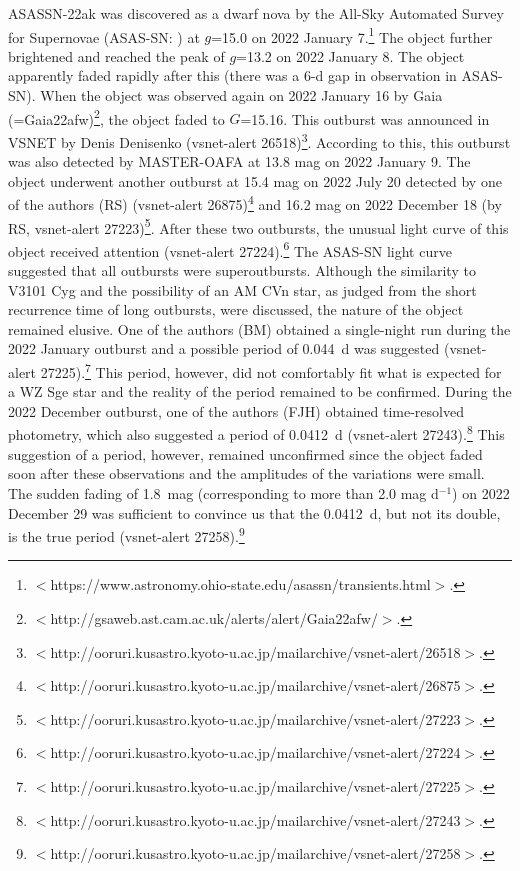 \documentclass{article}
\def\cite{\citealt}
\newcounter{author}
\begin{document}
   ASASSN-22ak was discovered as a dwarf nova by
the All-Sky Automated Survey for
Supernovae (ASAS-SN: \cite{ASASSN}) at $g$=15.0 on 2022 January 7.\footnote{
   $<$https://www.astronomy.ohio-state.edu/asassn/transients.html$>$.
}  The object further brightened and reached the peak of
$g$=13.2 on 2022 January 8.  The object apparently faded
rapidly after this (there was a 6-d gap in observation in
ASAS-SN).  When the object was observed again on 2022 January 16
by Gaia (=Gaia22afw)\footnote{
   $<$http://gsaweb.ast.cam.ac.uk/alerts/alert/Gaia22afw/$>$.
}, the object faded to $G$=15.16.
This outburst was announced in VSNET \citep{VSNET} by
Denis Denisenko (vsnet-alert 26518)\footnote{
   $<$http://ooruri.kusastro.kyoto-u.ac.jp/mailarchive/vsnet-alert/26518$>$.
}. According to this, this outburst was also detected by
MASTER-OAFA \citep{lip10MASTER} at 13.8 mag on 2022 January 9.
The object underwent another outburst
at 15.4 mag on 2022 July 20 detected by one of the authors (RS)
(vsnet-alert 26875)\footnote{
   $<$http://ooruri.kusastro.kyoto-u.ac.jp/mailarchive/vsnet-alert/26875$>$.
} and 16.2 mag on 2022 December 18 (by RS, vsnet-alert 27223)\footnote{
   $<$http://ooruri.kusastro.kyoto-u.ac.jp/mailarchive/vsnet-alert/27223$>$.
}.  After these two outbursts, the unusual light curve of
this object received attention (vsnet-alert 27224).\footnote{
   $<$http://ooruri.kusastro.kyoto-u.ac.jp/mailarchive/vsnet-alert/27224$>$.
}  The ASAS-SN light curve suggested that all outbursts
were superoutbursts.  Although the similarity to V3101 Cyg and
the possibility of an AM CVn star, as judged from the short
recurrence time of long outbursts, were discussed,
the nature of the object remained elusive.
One of the authors (BM) obtained a single-night run during
the 2022 January outburst and a possible period of 0.044~d
was suggested (vsnet-alert 27225).\footnote{
   $<$http://ooruri.kusastro.kyoto-u.ac.jp/mailarchive/vsnet-alert/27225$>$.
}  This period, however, did not comfortably fit what is
expected for a WZ Sge star and the reality of the period
remained to be confirmed.  During the 2022 December outburst,
one of the authors (FJH) obtained time-resolved photometry,
which also suggested a period of 0.0412~d (vsnet-alert 27243).\footnote{
   $<$http://ooruri.kusastro.kyoto-u.ac.jp/mailarchive/vsnet-alert/27243$>$.
}  This suggestion of a period, however, remained unconfirmed
since the object faded soon after these observations
and the amplitudes of the variations were small.
The sudden fading of 1.8~mag (corresponding to more than
2.0 mag d$^{-1}$) on 2022 December 29 was sufficient to
convince us that the 0.0412~d, but not its double, is
the true period (vsnet-alert 27258).\footnote{
   $<$http://ooruri.kusastro.kyoto-u.ac.jp/mailarchive/vsnet-alert/27258$>$.
}
\end{document}

